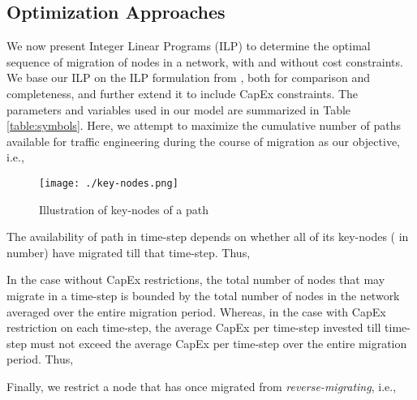 \documentclass[conference]{IEEEtran}
\begin{document}
\subsection{Optimization Approaches} \label{sec:ILP}
We now present Integer Linear Programs (ILP) to determine the optimal sequence
of migration of nodes in a network, with and without cost constraints.
We base our ILP on the ILP formulation from \cite{caria-sdn-migration}, both for
comparison and completeness, and further extend it to include CapEx constraints.
The parameters and variables used in our model are summarized in Table
\ref{table:symbols}. Here, we attempt to maximize the cumulative number of paths
available for traffic engineering during the course of migration as our
objective, i.e., 

\begin{figure}[t]
\begin{center}
\texttt{[image: ./key-nodes.png]}
\caption{Illustration of key-nodes of a path}
\label{fig:key-nodes}
\end{center}
\vspace{-5mm}
\end{figure}

\par The availability of path  in time-step  depends on whether all of
its key-nodes ( in number) have migrated till that time-step. Thus,


\par In the case without CapEx restrictions, the total number of nodes that may
migrate in a time-step is bounded by the total number of nodes in the network
averaged over the entire migration period. Whereas, in the case with CapEx
restriction on each time-step, the average CapEx per time-step invested till
time-step  must not exceed the average CapEx per time-step over the entire
migration period.
Thus, 


Finally, we restrict a node that has once migrated from \emph{reverse-migrating}, i.e.,
\end{document}
